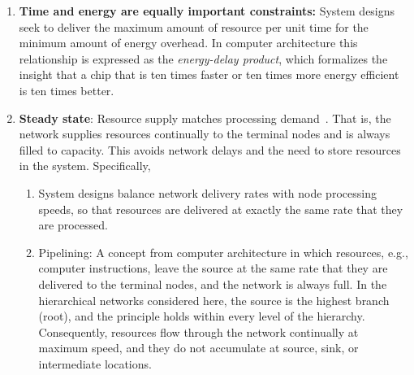 \documentclass[12pt]{article}
\begin{document}
\begin{enumerate}
\item {\bf Time and energy are equally important constraints:} 
  System designs seek to deliver the maximum amount of
  resource per unit time for the minimum amount of energy overhead. 
  In computer architecture this relationship is expressed as the
  \emph{energy-delay product}, which formalizes the insight that a
  chip that is ten times faster or ten times more energy efficient is
  ten times better. 

\item {\bf Steady state}: Resource supply matches processing
  demand~\cite{banavar10}.  That is, the network supplies resources continually
  to the terminal nodes and is always filled to capacity.  This avoids network
  delays and the need to store resources in the system. Specifically,

  \begin{enumerate}

\item System designs balance network delivery rates with node processing
  speeds, so that resources are delivered at exactly the same rate that they
  are processed.

\item Pipelining: A concept from computer architecture in which resources,
  e.g., computer instructions, leave the source at the same rate that they are
  delivered to the terminal nodes, and the network is always full.  In the
  hierarchical networks considered here, the source is the highest branch
  (root), and the principle holds within every level of the hierarchy.
  Consequently, resources flow through the network continually at maximum
  speed, and they do not accumulate at source, sink, or intermediate locations.
  \end{enumerate}


\end{enumerate}
\end{document}
